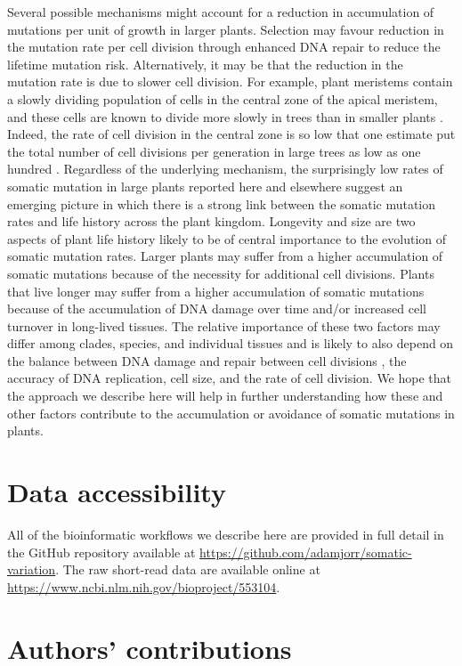 Several possible mechanisms might account for a reduction in accumulation of mutations per unit of growth in larger plants. Selection may favour reduction in the mutation rate per cell division through enhanced DNA repair to reduce the lifetime mutation risk. Alternatively, it may be that the reduction in the mutation rate is due to slower cell division. For example, plant meristems contain a slowly dividing population of cells in the central zone of the apical meristem, and these cells are known to divide more slowly in trees than in smaller plants \parencite{romberger_plant_1993}. Indeed, the rate of cell division in the central zone is so low that one estimate put the total number of cell divisions per generation in large trees as low as one hundred \parencite{romberger_plant_1993}. Regardless of the underlying mechanism, the surprisingly low rates of somatic mutation in large plants reported here and elsewhere suggest an emerging picture in which there is a strong link between the somatic mutation rates and life history across the plant kingdom. Longevity and size are two aspects of plant life history likely to be of central importance to the evolution of somatic mutation rates. Larger plants may suffer from a higher accumulation of somatic mutations because of the necessity for additional cell divisions. Plants that live longer may suffer from a higher accumulation of somatic mutations because of the accumulation of DNA damage over time and/or increased cell turnover in long-lived tissues. The relative importance of these two factors may differ among clades, species, and individual tissues and is likely to also depend on the balance between DNA damage and repair between cell divisions \parencite{gao_interpreting_2016}, the accuracy of DNA replication, cell size, and the rate of cell division. We hope that the approach we describe here will help in further understanding how these and other factors contribute to the accumulation or avoidance of somatic mutations in plants.

\section{Data accessibility}

All of the bioinformatic workflows we describe here are provided in full detail in the GitHub repository available at \url{https://github.com/adamjorr/somatic-variation}. The raw short-read data are available online at \url{https://www.ncbi.nlm.nih.gov/bioproject/553104}.

\section{Authors' contributions}

